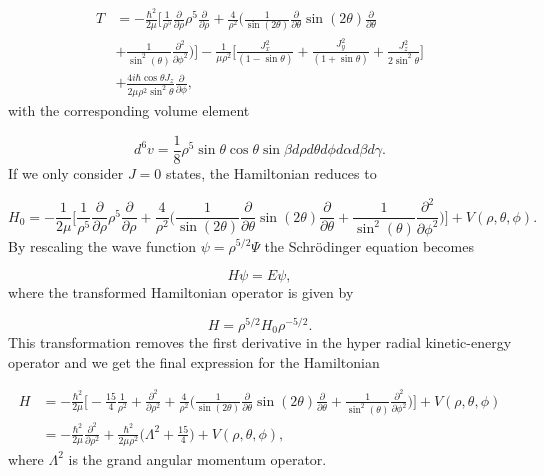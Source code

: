 \begin{equation}
\begin{aligned}
T &=-\frac{\hbar^2}{2\mu}\Bigg[\frac{1}{\rho^5}\frac{\partial}{\partial\rho}\rho^5\frac{\partial}{\partial\rho} + \frac{4}{\rho^2}\Bigg(\frac{1}{\sin(2\theta)}\frac{\partial}{\partial\theta}\sin(2\theta)\frac{\partial}{\partial\theta}\\
&+\frac{1}{\sin^2(\theta)}\frac{\partial^2}{\partial\phi^2} \Bigg)\Bigg]-\frac{1}{\mu\rho^2}\Bigg[\frac{J^2_x}{(1-\sin\theta)} + \frac{J^2_y}{(1+\sin\theta)} +\frac{J^2_z}{2\sin^2\theta}\Bigg]\\
&+ \frac{4i\hbar\cos\theta J_z}{2\mu\rho^2\sin^2\theta}\frac{\partial}{\partial\phi},
\end{aligned}
\end{equation}
with the corresponding volume element

\begin{equation}
d^6 v = \frac{1}{8}\rho^5 \sin\theta\cos\theta\sin\beta d\rho d\theta d\phi d\alpha d\beta d\gamma.
\end{equation}
If we only consider $J=0$ states, the Hamiltonian reduces to 

\begin{equation}
H_{0} = -\frac{1}{2 \mu} \Bigg[ \frac{1}{\rho^{5}} \frac{\partial}{\partial \rho} \rho^{5} \frac{\partial}{\partial \rho} + \frac{4}{\rho^{2}}\Big( \frac{1}{\sin(2\theta)} \frac{\partial}{\partial \theta} \sin(2\theta) \frac{\partial}{\partial \theta} + \frac{1}{\sin^{2}(\theta)} \frac{\partial^{2}}{\partial \phi^{2}} \Big) \Bigg] + V(\rho, \theta, \phi).
\end{equation}
By rescaling the wave function $\psi = \rho^{5/2} \Psi$ the Schr{\"o}dinger equation becomes

\begin{equation}
H \psi = E \psi,
\end{equation}
where the transformed Hamiltonian operator is given by

\begin{equation}
H = \rho^{5/2}H_{0} \rho^{-5/2}. 
\end{equation}
This transformation removes the first derivative in the hyper radial kinetic-energy operator and we get the final expression for the Hamiltonian

\begin{align}
H &= -\frac{\hbar^{2}}{2 \mu} \Bigg[ -\frac{15}{4} \frac{1}{\rho^{2}} + \frac{\partial^{2}}{\partial \rho^{2}}+ \frac{4}{\rho^{2}}\Big( \frac{1}{\sin(2\theta)} \frac{\partial}{\partial \theta} \sin(2\theta) \frac{\partial}{\partial \theta} + \frac{1}{\sin^{2}(\theta)} \frac{\partial^{2}}{\partial \phi^{2}} \Big) \Bigg] + V(\rho, \theta, \phi)\\
&= -\frac{\hbar^{2}}{2 \mu}\frac{\partial^2}{\partial \rho^2} + \frac{\hbar^{2}}{2 \mu \rho^{2} } \Bigg(\Lambda^2 + \frac{15}{4}\Bigg)+ V(\rho, \theta, \phi),
\end{align}
where $\Lambda^2$ is the grand angular momentum operator.